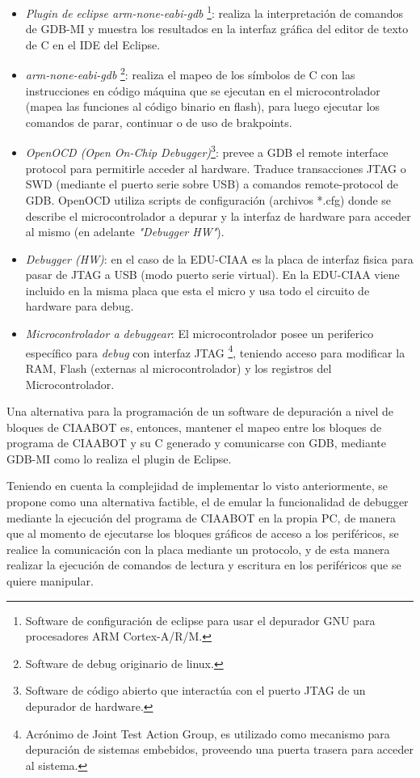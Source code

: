 \begin{itemize}
	\item \emph{Plugin de eclipse arm-none-eabi-gdb}
	\footnote{Software de configuración de eclipse para usar el depurador GNU para procesadores ARM Cortex-A/R/M.}: realiza la interpretación de comandos de	GDB-MI y muestra los resultados en la interfaz gráfica del editor de texto de C en el IDE del Eclipse.
	\item \emph{arm-none-eabi-gdb}
	\footnote{Software de debug originario de linux.}: realiza el mapeo de los símbolos de C con las instrucciones en código máquina que se ejecutan en el microcontrolador (mapea las funciones al código binario en flash), para
	luego ejecutar los comandos de parar, continuar o de uso de brakpoints.
	\item \emph{OpenOCD (Open On-Chip Debugger)}\footnote{Software de código abierto que interactúa con el puerto JTAG de un depurador de hardware.}: prevee a GDB el remote interface protocol para permitirle acceder al hardware. Traduce transacciones JTAG o SWD (mediante el puerto serie sobre USB) a comandos remote-protocol de GDB. OpenOCD utiliza scripts de configuración (archivos *.cfg) donde se describe el microcontrolador a depurar y la interfaz de hardware para acceder al mismo (en adelante \emph{"Debugger HW"}).
	\item \emph{Debugger (HW)}: en el caso de la EDU-CIAA es la placa de interfaz fisica para pasar de JTAG a USB (modo puerto serie virtual). En la EDU-CIAA
	viene incluido en la misma placa que esta el micro y usa todo el circuito de hardware para debug.
	\item \emph{Microcontrolador a debuggear}: El microcontrolador posee un periferico específico para \emph{debug} con interfaz JTAG
	\footnote{Acrónimo de Joint Test Action Group, es utilizado como mecanismo para depuración de sistemas embebidos, proveendo una puerta trasera para acceder al sistema.}, teniendo acceso para modificar la RAM, Flash (externas al microcontrolador) y los registros del Microcontrolador.
\end{itemize}

Una alternativa para la programación de un software de depuración a nivel de bloques de CIAABOT es, entonces, mantener el mapeo entre los bloques de programa de CIAABOT y su C generado y comunicarse con GDB, mediante GDB-MI como lo realiza el plugin de Eclipse.

Teniendo en cuenta la complejidad de implementar lo visto anteriormente, se propone como una alternativa factible, el de emular la funcionalidad de debugger mediante la ejecución del programa de CIAABOT en la propia PC, de manera que al momento de ejecutarse los bloques gráficos de acceso a los periféricos, se realice la comunicación con la placa mediante un protocolo, y de esta manera realizar la ejecución de comandos de lectura y escritura en los periféricos que se quiere manipular.

